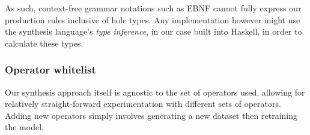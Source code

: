 \documentclass{article}
\begin{document}
As such, context-free grammar notations such as EBNF cannot
fully express our production rules inclusive of hole types.
Any implementation however might use the synthesis language's \emph{type inference},
in our case built into Haskell, in order to calculate these types.




\subsubsection{Operator whitelist}

Our synthesis approach itself is agnostic to the set of operators used,
allowing for relatively straight-forward experimentation with different sets of operators.
Adding new operators simply involves generating a new dataset then retraining the model.
\end{document}

